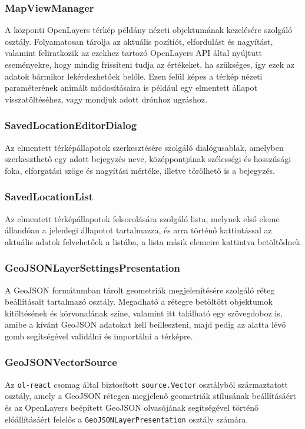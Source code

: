 \subsubsection{MapViewManager}
A központi OpenLayers térkép példány nézeti objektumának kezelésére szolgáló
osztály. Folyamatosan tárolja az aktuális pozítiót, elfordulást és nagyítást,
valamint feliratkozik az ezekhez tartozó OpenLayers API által nyújtutt
eseményekre, hogy mindig frissíteni tudja az értékeket, ha szükséges, így ezek
az adatok bármikor lekérdezhetőek belőle. Ezen felül képes a térkép nézeti
paraméterének animált módosításaira is például egy elmentett állapot
visszatöltéséhez, vagy mondjuk adott drónhoz ugráshoz.

\subsubsection{SavedLocationEditorDialog}
Az elmentett térképállapotok szerkesztésére szolgáló dialógusablak, amelyben
szerkeszthető egy adott bejegyzés neve, középpontjának szélességi és hosszúsági
foka, elforgatási szöge és nagyítási mértéke, illetve törölhető is a bejegyzés.

\subsubsection{SavedLocationList}
Az elmentett térképállapotok felsorolására szolgáló lista, melynek első eleme
állandóan a jelenlegi állapotot tartalmazza, és arra történő kattintással az
aktuális adatok felvehetőek a listába, a lista másik elemeire kattintva
betöltődnek

\subsubsection{GeoJSONLayerSettingsPresentation}
A GeoJSON formátumban tárolt geometriák megjelenítésére szolgáló réteg
beállításait tartalmazó osztály. Megadható a rétegre betöltött objektumok
kitöltésének és körvonalának színe, valamint itt található egy szövegdoboz is,
amibe a kívánt GeoJSON adatokat kell beilleszteni, majd pedig az alatta lévő
gomb segítségével validálni és importálni a térképre.

\subsubsection{GeoJSONVectorSource}
Az \verb|ol-react| csomag által biztosított \verb|source.Vector| osztályból
származtatott osztály, amely a GeoJSON rétegen megjelenő geometriák stílusának
beállításáért és az OpenLayers beépített GeoJSON olvasójának segítségével
történő előállításáért felelős a \verb|GeoJSONLayerPresentation| osztály
számára.

